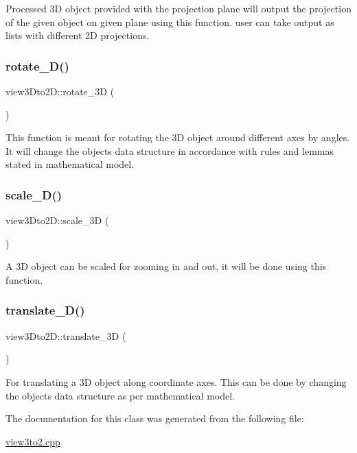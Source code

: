 Processed 3D object provided with the projection plane will output the projection of the given object on given plane using this function. user can take output as lists with different 2D projections.\mbox{\label{classview3Dto2D_a08491d952539c911a02489a500e8f830}} 
\subsubsection{\texorpdfstring{rotate\+\_\+D()}{rotate\_3D()}}
{\footnotesize\ttfamily view3\+Dto2\+D\+::rotate\+\_\+3D (\begin{DoxyParamCaption}{ }\end{DoxyParamCaption})\hspace{0.3cm}{\ttfamily [inline]}}

This function is meant for rotating the 3D object around different axes by angles. It will change the objects data structure in accordance with rules and lemmas stated in mathematical model.\mbox{\label{classview3Dto2D_a9f4eb503f1f50649fb38df348e1f836b}} 
\subsubsection{\texorpdfstring{scale\+\_\+D()}{scale\_3D()}}
{\footnotesize\ttfamily view3\+Dto2\+D\+::scale\+\_\+3D (\begin{DoxyParamCaption}{ }\end{DoxyParamCaption})\hspace{0.3cm}{\ttfamily [inline]}}

A 3D object can be scaled for zooming in and out, it will be done using this function.\mbox{\label{classview3Dto2D_a9d2c4326ea37b4020ab55e23133105fd}} 
\subsubsection{\texorpdfstring{translate\+\_\+D()}{translate\_3D()}}
{\footnotesize\ttfamily view3\+Dto2\+D\+::translate\+\_\+3D (\begin{DoxyParamCaption}{ }\end{DoxyParamCaption})\hspace{0.3cm}{\ttfamily [inline]}}

For translating a 3D object along coordinate axes. This can be done by changing the object\textquotesingle{}s data structure as per mathematical model.

The documentation for this class was generated from the following file\+:\begin{DoxyCompactItemize}
\item 
\hyperlink{view3to2_8cpp}{view3to2.\+cpp}\end{DoxyCompactItemize}
